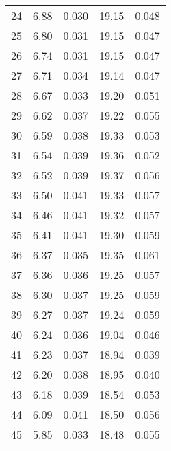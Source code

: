 \begin{table}
\begin{tabular}{c|ll|ll}
24 & 6.88 & 0.030 & 19.15 & 0.048 \\
25 & 6.80 & 0.031 & 19.15 & 0.047 \\
26 & 6.74 & 0.031 & 19.15 & 0.047 \\
27 & 6.71 & 0.034 & 19.14 & 0.047 \\
28 & 6.67 & 0.033 & 19.20 & 0.051 \\
29 & 6.62 & 0.037 & 19.22 & 0.055 \\
30 & 6.59 & 0.038 & 19.33 & 0.053 \\
31 & 6.54 & 0.039 & 19.36 & 0.052 \\
32 & 6.52 & 0.039 & 19.37 & 0.056 \\
33 & 6.50 & 0.041 & 19.33 & 0.057 \\
34 & 6.46 & 0.041 & 19.32 & 0.057 \\
35 & 6.41 & 0.041 & 19.30 & 0.059 \\
36 & 6.37 & 0.035 & 19.35 & 0.061 \\
37 & 6.36 & 0.036 & 19.25 & 0.057 \\
38 & 6.30 & 0.037 & 19.25 & 0.059 \\
39 & 6.27 & 0.037 & 19.24 & 0.059 \\
40 & 6.24 & 0.036 & 19.04 & 0.046 \\
41 & 6.23 & 0.037 & 18.94 & 0.039 \\
42 & 6.20 & 0.038 & 18.95 & 0.040 \\
43 & 6.18 & 0.039 & 18.54 & 0.053 \\
44 & 6.09 & 0.041 & 18.50 & 0.056 \\
45 & 5.85 & 0.033 & 18.48 & 0.055 \\
               \hline
        \end{tabular}
    \end{table}
    \clearpage

